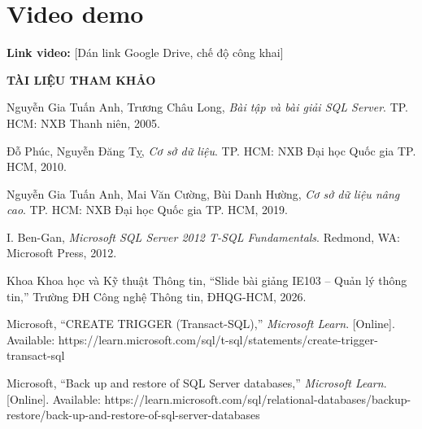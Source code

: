 \documentclass[13pt,a4paper,oneside]{extreport}
\begin{document}
\section{Video demo}
\textbf{Link video:} [Dán link Google Drive, chế độ công khai]

\clearpage
{}
{}
\begin{center}{\bfseries\Large\color{xanh} TÀI LIỆU THAM KHẢO}\end{center}
{\sloppy
\begin{enumerate}[label={[\arabic*]},leftmargin=2.5em,itemsep=2pt]
\item Nguyễn Gia Tuấn Anh, Trương Châu Long, \textit{Bài tập và bài giải SQL Server}. TP. HCM: NXB Thanh niên, 2005.
\item Đỗ Phúc, Nguyễn Đăng Tỵ, \textit{Cơ sở dữ liệu}. TP. HCM: NXB Đại học Quốc gia TP. HCM, 2010.
\item Nguyễn Gia Tuấn Anh, Mai Văn Cường, Bùi Danh Hường, \textit{Cơ sở dữ liệu nâng cao}. TP. HCM: NXB Đại học Quốc gia TP. HCM, 2019.
\item I. Ben-Gan, \textit{Microsoft SQL Server 2012 T-SQL Fundamentals}. Redmond, WA: Microsoft Press, 2012.
\item Khoa Khoa học và Kỹ thuật Thông tin, ``Slide bài giảng IE103 -- Quản lý thông tin,'' Trường ĐH Công nghệ Thông tin, ĐHQG-HCM, 2026.
\item Microsoft, ``CREATE TRIGGER (Transact-SQL),'' \textit{Microsoft Learn}. [Online]. Available: https://learn.microsoft.com/sql/t-sql/statements/create-trigger-transact-sql
\item Microsoft, ``Back up and restore of SQL Server databases,'' \textit{Microsoft Learn}. [Online]. Available: https://learn.microsoft.com/sql/relational-databases/backup-restore/back-up-and-restore-of-sql-server-databases
\end{enumerate}
\par}
\end{document}
